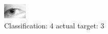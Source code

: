 \begin{figure}[h!]
\begin{center}
\includegraphics[width=0.60\columnwidth]{figures/ID1405_class_4_target_3.png}
\end{center}
\caption{ Classification: 4 actual target: 3}
\label{fig:ID1405_class_4_target_3}
\end{figure}
